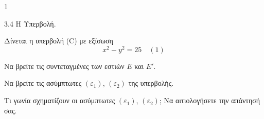 \begin{ylh}{1}
    \item 3.4 Η Υπερβολή.
\end{ylh}
Δίνεται η υπερβολή (C) με εξίσωση
\[ x^2 - y^2 = 25 \quad (1) \]
\begin{alist}
\item Να βρείτε τις συντεταγμένες των εστιών $E$ και $E'$. 
\item Να βρείτε τις ασύμπτωτες $(\varepsilon_1)$, $(\varepsilon_2)$ της υπερβολής. 
\item Τι γωνία σχηματίζουν οι ασύμπτωτες $(\varepsilon_1)$, $(\varepsilon_2)$; Να αιτιολογήσετε την απάντησή σας. 
\end{alist}